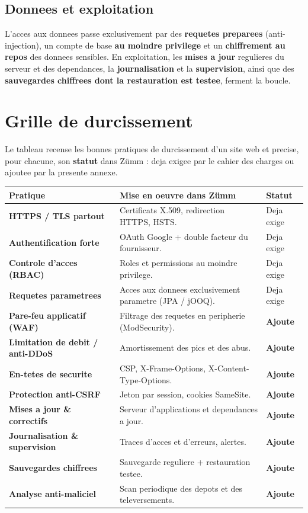 \subsection{Donnees et exploitation}
L'acces aux donnees passe exclusivement par des \textbf{requetes preparees}
(anti-injection), un compte de base \textbf{au moindre privilege} et un
\textbf{chiffrement au repos} des donnees sensibles. En exploitation, les
\textbf{mises a jour} regulieres du serveur et des dependances, la
\textbf{journalisation} et la \textbf{supervision}, ainsi que des
\textbf{sauvegardes chiffrees dont la restauration est testee}, ferment la boucle.

\section{Grille de durcissement}
Le tableau recense les bonnes pratiques de durcissement d'un site web et precise,
pour chacune, son \textbf{statut} dans Z\"umm : deja exigee par le cahier des
charges ou ajoutee par la presente annexe.
\begin{xltabular}{\textwidth}{>{\bfseries}p{4.2cm} X C{2.2cm}}
\toprule
\textbf{Pratique} & \textbf{Mise en oeuvre dans Z\"umm} & \textbf{Statut} \\
\midrule
\endhead
HTTPS / TLS partout & Certificats X.509, redirection HTTPS, HSTS. & Deja exige \\
Authentification forte & OAuth Google + double facteur du fournisseur. & Deja exige \\
Controle d'acces (RBAC) & Roles et permissions au moindre privilege. & Deja exige \\
Requetes parametrees & Acces aux donnees exclusivement parametre (JPA / jOOQ). & Deja exige \\
Pare-feu applicatif (WAF) & Filtrage des requetes en peripherie (ModSecurity). & \textbf{Ajoute} \\
Limitation de debit / anti-DDoS & Amortissement des pics et des abus. & \textbf{Ajoute} \\
En-tetes de securite & CSP, X-Frame-Options, X-Content-Type-Options. & \textbf{Ajoute} \\
Protection anti-CSRF & Jeton par session, cookies SameSite. & \textbf{Ajoute} \\
Mises a jour \& correctifs & Serveur d'applications et dependances a jour. & \textbf{Ajoute} \\
Journalisation \& supervision & Traces d'acces et d'erreurs, alertes. & \textbf{Ajoute} \\
Sauvegardes chiffrees & Sauvegarde reguliere + restauration testee. & \textbf{Ajoute} \\
Analyse anti-maliciel & Scan periodique des depots et des televersements. & \textbf{Ajoute} \\
\bottomrule
\end{xltabular}

